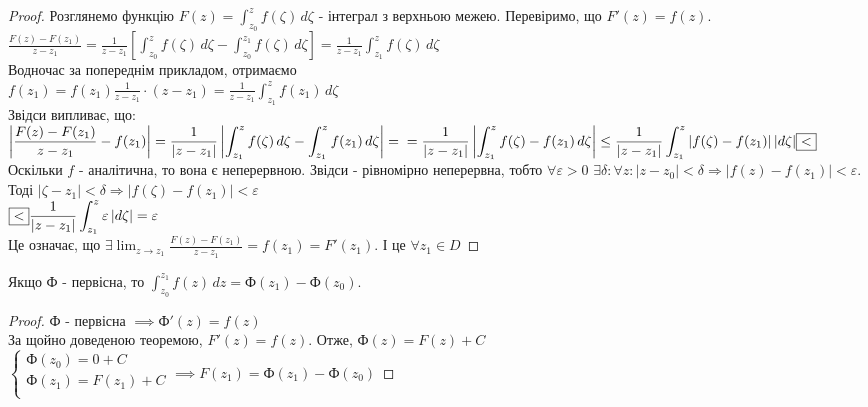 \documentclass{math_library}
\begin{document}
\begin{proof}
Розглянемо функцію $F(z)=\displaystyle \int_{z_0}^z f(\zeta)\,d\zeta$ - інтеграл з верхньою межею. Перевіримо, що $F'(z)=f(z)$.\\
	$\displaystyle \frac{F(z)-F(z_1)}{z-z_1} = \frac{1}{z-z_1} \left[ \int_{z_0}^z f(\zeta)\,d\zeta - \int_{z_0}^{z_1} f(\zeta)\,d\zeta \right] = \frac{1}{z-z_1} \int_{z_1}^z f(\zeta)\,d\zeta$\\
Водночас за попереднім прикладом, отримаємо\\
	$\displaystyle f(z_1)=f(z_1)\frac{1}{z-z_1}\cdot(z-z_1)=\frac{1}{z-z_1} \int_{z_1}^z f(z_1)\,d\zeta$\\
Звідси випливає, що:\\
$\displaystyle \left\lvert \frac{F(z)-F(z_1)}{z-z_1} - f(z_1) \right\rvert = \frac{1}{|z-z_1|} \left\lvert \int_{z_1}^z f(\zeta)\,d\zeta - \int_{z_1}^z f(z_1)\,d\zeta \right\rvert =\\= \frac{1}{|z-z_1|} \left\lvert \int_{z_1}^z f(\zeta)-f(z_1)\,d\zeta \right\rvert \leq \frac{1}{|z-z_1|} \int_{z_1}^z |f(\zeta)-f(z_1)|\,|d\zeta|\fbox{<}$\\
	Оскільки $f$ - аналітична, то вона є неперервною. Звідси - рівномірно неперервна, тобто $\forall \varepsilon>0$ $\exists \delta: \forall z: |z-z_0|<\delta \Rightarrow |f(z)-f(z_1)|<\varepsilon$. Тоді $|\zeta - z_1|<\delta \Rightarrow |f(\zeta)-f(z_1)|<\varepsilon$\\
	$\displaystyle \fbox{<} \frac{1}{|z-z_1|} \int_{z_1}^z \varepsilon \,|d\zeta| = \varepsilon$\\
	Це означає, що $\displaystyle \exists \lim_{z\to z_1} \frac{F(z)-F(z_1)}{z-z_1}=f(z_1)=F'(z_1)$. І це $\forall z_1 \in D$
\end{proof}
	
\begin{corollary}
Якщо $\textrm{Ф}$ - первісна, то $\displaystyle \int_{z_0}^{z_1} f(z)\,dz = \textrm{Ф}(z_1)-\textrm{Ф}(z_0)$.
\end{corollary}

\begin{proof}
$\textrm{Ф}$ - первісна $\implies \textrm{Ф}'(z)=f(z)$\\
За щойно доведеною теоремою, $F'(z)=f(z)$. Отже, $\textrm{Ф}(z)=F(z)+C$\\
$\begin{cases}
	\textrm{Ф}(z_0) = 0 + C\\
	\textrm{Ф}(z_1) = F(z_1) + C\\
\end{cases} \implies F(z_1)=\textrm{Ф}(z_1)-\textrm{Ф}(z_0)$
\end{proof}
\end{document}
